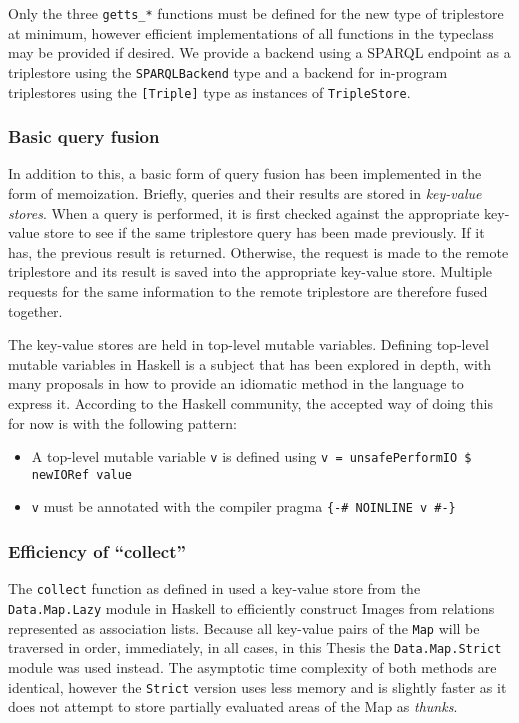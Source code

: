 \documentclass[../main.tex]{subfiles}
\begin{document}
Only the three \texttt{getts\_*} functions must be defined for the new type of triplestore at minimum, however efficient implementations
of all functions in the typeclass may be provided if desired.  We provide a backend using a SPARQL endpoint as a triplestore using the
\texttt{SPARQLBackend} type and a backend for in-program triplestores using the \texttt{[Triple]} type as instances of \texttt{TripleStore}.

\subsubsection{Basic query fusion}

In addition to this, a basic form of query fusion has been implemented in the form of memoization.  Briefly, queries and their results
are stored in {\em key-value stores}.  When a query is performed, it is first checked against the appropriate key-value store to see
if the same triplestore query has been made previously.  If it has, the previous result is returned.  Otherwise, the request is made to the remote
triplestore and its result is saved into the appropriate key-value store.  Multiple requests for the same information to the remote triplestore are therefore fused together.

The key-value stores are held in top-level mutable variables.  Defining top-level mutable variables in Haskell is a subject that has been explored in depth, with many proposals in how to provide an idiomatic method in the language to express it.  According to the Haskell community, the accepted way of doing this for now is with the following pattern\cite{tlmvconsensus}:

\begin{itemize}
	\item A top-level mutable variable \texttt{v} is defined using \texttt{v = unsafePerformIO \$ newIORef value} 
	\item \texttt{v} must be annotated with the compiler pragma \texttt{\{\--\# NOINLINE v \#\--\}}
\end{itemize}

\subsubsection{Efficiency of ``collect''}

The \texttt{collect} function as defined in \cite{agboola2015extensible} used a key-value store from the \texttt{Data.Map.Lazy} module in Haskell to efficiently construct Images from relations represented as association lists.  Because all key-value pairs of the \texttt{Map} will be traversed in order, immediately, in all cases, in this Thesis the \texttt{Data.Map.Strict} module was used instead.  The asymptotic time complexity of both methods are identical, however the \texttt{Strict} version uses less memory and is slightly faster as it does not attempt to store partially evaluated areas of the Map as {\em thunks}.
\end{document}
